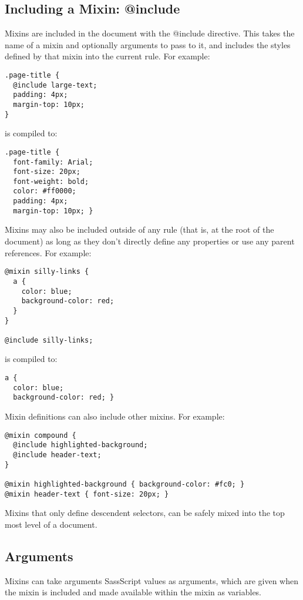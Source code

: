 \documentclass[9pt]{article}
\begin{document}
\subsection{Including a Mixin: @include}


 Mixins are included in the document with the @include directive. This takes the name of a mixin and optionally arguments to pass to it, and includes the styles defined by that mixin into the current rule. For example:
\begin{verbatim}
.page-title {
  @include large-text;
  padding: 4px;
  margin-top: 10px;
}
\end{verbatim}


 is compiled to:
\begin{verbatim}
.page-title {
  font-family: Arial;
  font-size: 20px;
  font-weight: bold;
  color: #ff0000;
  padding: 4px;
  margin-top: 10px; }
\end{verbatim}


 Mixins may also be included outside of any rule (that is, at the root of the document) as long as they don’t directly define any properties or use any parent references. For example:
\begin{verbatim}
@mixin silly-links {
  a {
    color: blue;
    background-color: red;
  }
}

@include silly-links;
\end{verbatim}


 is compiled to:
\begin{verbatim}
a {
  color: blue;
  background-color: red; }
\end{verbatim}


 Mixin definitions can also include other mixins. For example:
\begin{verbatim}
@mixin compound {
  @include highlighted-background;
  @include header-text;
}

@mixin highlighted-background { background-color: #fc0; }
@mixin header-text { font-size: 20px; }
\end{verbatim}


 Mixins that only define descendent selectors, can be safely mixed into the top most level of a document.
\subsection{Arguments}


 Mixins can take arguments SassScript values as arguments, which are given when the mixin is included and made available within the mixin as variables.
\end{document}
